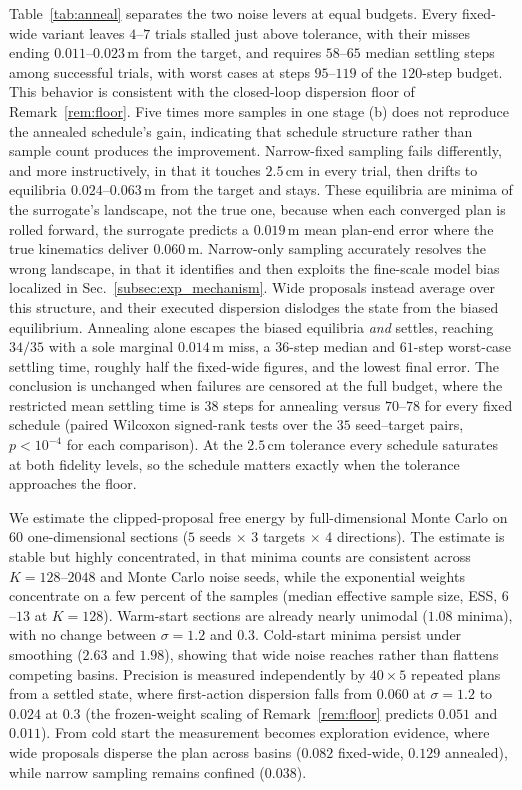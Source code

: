 \documentclass[letterpaper,10pt,conference]{ieeeconf}
\begin{document}
Table~\ref{tab:anneal} separates the two noise levers at equal budgets.
Every fixed-wide variant leaves $4$--$7$ trials stalled just above tolerance, with their misses ending $0.011$--$0.023$\,m from the target, and requires $58$--$65$ median settling steps among successful trials, with worst cases at steps $95$--$119$ of the $120$-step budget. This behavior is consistent with the closed-loop dispersion floor of Remark~\ref{rem:floor}.
Five times more samples in one stage (b) does not reproduce the annealed schedule's gain, indicating that schedule structure rather than sample count produces the improvement.
Narrow-fixed sampling fails differently, and more instructively, in that it touches $2.5$\,cm in every trial, then drifts to equilibria $0.024$--$0.063$\,m from the target and stays.
These equilibria are minima of the surrogate's landscape, not the true one, because when each converged plan is rolled forward, the surrogate predicts a $0.019$\,m mean plan-end error where the true kinematics deliver $0.060$\,m.
Narrow-only sampling accurately resolves the wrong landscape, in that it identifies and then exploits the fine-scale model bias localized in Sec.~\ref{subsec:exp_mechanism}. Wide proposals instead average over this structure, and their executed dispersion dislodges the state from the biased equilibrium.
Annealing alone escapes the biased equilibria \emph{and} settles, reaching $34/35$ with a sole marginal $0.014$\,m miss, a $36$-step median and $61$-step worst-case settling time, roughly half the fixed-wide figures, and the lowest final error.
The conclusion is unchanged when failures are censored at the full budget, where the restricted mean settling time is $38$ steps for annealing versus $70$--$78$ for every fixed schedule (paired Wilcoxon signed-rank tests over the $35$ seed--target pairs, $p < 10^{-4}$ for each comparison).
At the $2.5$\,cm tolerance every schedule saturates at both fidelity levels, so the schedule matters exactly when the tolerance approaches the floor.

We estimate the clipped-proposal free energy by full-dimensional Monte Carlo on $60$ one-dimensional sections ($5$ seeds $\times$ $3$ targets $\times$ $4$ directions).
The estimate is stable but highly concentrated, in that minima counts are consistent across $K = 128$--$2048$ and Monte Carlo noise seeds, while the exponential weights concentrate on a few percent of the samples (median effective sample size, ESS, $6$--$13$ at $K{=}128$).
Warm-start sections are already nearly unimodal ($1.08$ minima), with no change between $\sigma=1.2$ and $0.3$.
Cold-start minima persist under smoothing ($2.63$ and $1.98$), showing that wide noise reaches rather than flattens competing basins.
Precision is measured independently by $40\times5$ repeated plans from a settled state, where first-action dispersion falls from $0.060$ at $\sigma=1.2$ to $0.024$ at $0.3$ (the frozen-weight scaling of Remark~\ref{rem:floor} predicts $0.051$ and $0.011$).
From cold start the measurement becomes exploration evidence, where wide proposals disperse the plan across basins ($0.082$ fixed-wide, $0.129$ annealed), while narrow sampling remains confined ($0.038$).
\end{document}
